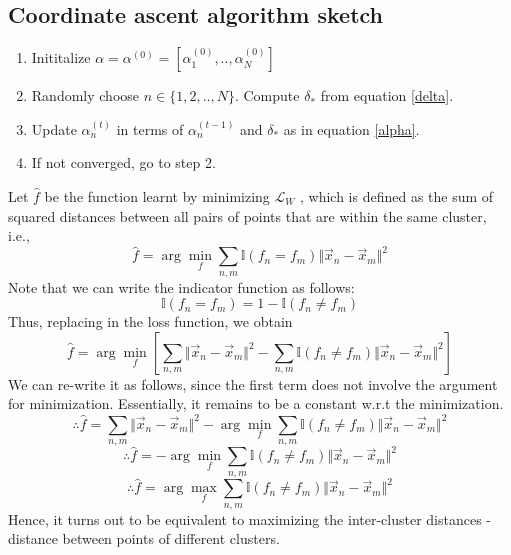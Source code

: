 \documentclass[a4paper,11pt]{article}
\begin{document}
\begin{mlsolution}
\subsection{Coordinate ascent algorithm sketch}
\begin{enumerate}
	\item Inititalize $\alpha = \alpha^{(0)} = [\alpha^{(0)}_{1}, .., \alpha^{(0)}_{N}]$
	\item Randomly choose $n \in \{1,2,..,N\}$. Compute $\delta_{*}$ from equation \ref{delta}. 
	\item Update $\alpha^{(t)}_n$ in terms of $\alpha^{(t-1)}_{n}$ and $\delta_{*}$ as in equation \ref{alpha}.
	\item If not converged, go to step 2.
\end{enumerate}

\end{mlsolution}

\begin{mlsolution} 
Let $\hat{f}$ be the function learnt by minimizing $\mathcal{L}_{W}$ , which is defined as the sum of squared distances between all pairs of points that are within the same cluster, i.e.,
\[
\hat{f} = \arg \min_{f} \sum_{n,m} \mathbb{I}(f_n = f_m)\Vert\vec{x}_{n} - \vec{x}_{m}\Vert^{2}
\]
Note that we can write the indicator function as follows:
\[
\mathbb{I}(f_n = f_m) = 1 - \mathbb{I}(f_n \neq f_m)
\]
Thus, replacing in the loss function, we obtain
\[
\hat{f} = \arg \min_{f} \left[ \sum_{n,m} \Vert\vec{x}_{n} - \vec{x}_{m}\Vert^{2} - \sum_{n,m}\mathbb{I}(f_n \neq f_m) \Vert\vec{x}_{n} - \vec{x}_{m}\Vert^{2} \right] 
\]
We can re-write it as follows, since the first term does not involve the argument for minimization. Essentially, it remains to be a constant w.r.t the minimization.
\[
\therefore \hat{f} = \sum_{n,m} \Vert\vec{x}_{n} - \vec{x}_{m}\Vert^{2} - \arg \min_{f}  \sum_{n,m}\mathbb{I}(f_n \neq f_m) \Vert\vec{x}_{n} - \vec{x}_{m}\Vert^{2}  
\]
\[
\therefore \hat{f} = - \arg \min_{f}  \sum_{n,m}\mathbb{I}(f_n \neq f_m) \Vert\vec{x}_{n} - \vec{x}_{m}\Vert^{2}
\]
\[
\boxed{\therefore \hat{f} = \arg \max_{f}  \sum_{n,m}\mathbb{I}(f_n \neq f_m) \Vert\vec{x}_{n} - \vec{x}_{m}\Vert^{2}}
\]
Hence, it turns out to be equivalent to maximizing the inter-cluster distances - distance between points of different clusters. 
\end{mlsolution}
\end{document}

